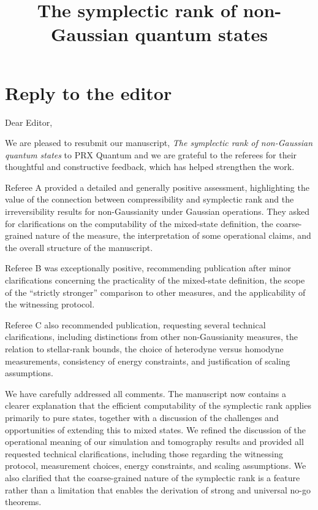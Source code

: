 \documentclass[a4paper,12pt]{article}
\begin{document}
\title{The symplectic rank of non-Gaussian quantum states}

\date{}
\maketitle


\section{Reply to the editor}

Dear Editor,

\medskip

We are pleased to resubmit our manuscript, \emph{The symplectic rank of non-Gaussian quantum states} to PRX Quantum and we are grateful to the referees for their thoughtful and constructive feedback, which has helped strengthen the work.

\medskip

Referee A provided a detailed and generally positive assessment, highlighting the value of the connection between compressibility and symplectic rank and the irreversibility results for non-Gaussianity under Gaussian operations. They asked for clarifications on the computability of the mixed-state definition, the coarse-grained nature of the measure, the interpretation of some operational claims, and the overall structure of the manuscript. 

Referee B was exceptionally positive, recommending publication after minor clarifications concerning the practicality of the mixed-state definition, the scope of the “strictly stronger” comparison to other measures, and the applicability of the witnessing protocol. 

Referee C also recommended publication, requesting several technical clarifications, including distinctions from other non-Gaussianity measures, the relation to stellar-rank bounds, the choice of heterodyne versus homodyne measurements, consistency of energy constraints, and justification of scaling assumptions.

\medskip

We have carefully addressed all comments. The manuscript now contains a clearer explanation that the efficient computability of the symplectic rank applies primarily to pure states, together with a discussion of the challenges and opportunities of extending this to mixed states. We refined the discussion of the operational meaning of our simulation and tomography results and provided all requested technical clarifications, including those regarding the witnessing protocol, measurement choices, energy constraints, and scaling assumptions. We also clarified that the coarse-grained nature of the symplectic rank is a feature rather than a limitation that enables the derivation of strong and universal no-go theorems.
\end{document}
